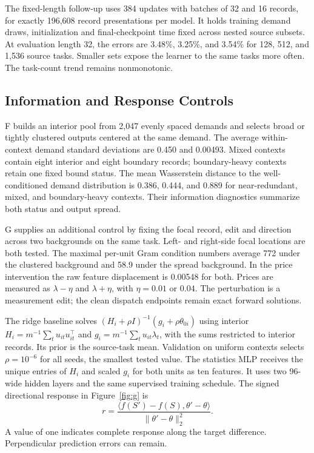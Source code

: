 \documentclass{article}
\begin{document}
The fixed-length follow-up uses 384 updates with batches of 32 and
16 records, for exactly 196,608 record presentations per model. It
holds training demand draws, initialization and final-checkpoint time
fixed across nested source subsets. At evaluation length 32, the
errors are 3.48\%, 3.25\%, and 3.54\% for 128, 512, and 1,536
source tasks. Smaller sets expose the learner to the same tasks more
often. The task-count trend remains nonmonotonic.

\subsection{Information and Response Controls}
F builds an interior pool from 2,047 evenly spaced demands and selects
broad or tightly clustered outputs centered at the same demand.
The average within-context demand standard deviations are 0.450 and
0.00493. Mixed contexts contain eight interior and eight boundary
records; boundary-heavy contexts retain one fixed bound status.
The mean Wasserstein distance to the well-conditioned demand
distribution is 0.386, 0.444, and 0.889 for near-redundant, mixed,
and boundary-heavy contexts. Their information diagnostics summarize
both status and output spread.

\begin{table}[h]
\centering

\caption{F, 16-record contexts on matched tasks. The Gram diagnostic
is the smallest interior-Gram eigenvalue across generators, normalized
by total context length. Error shows mean $\pm$ seed SD.}
\label{tab:f}
\end{table}

G supplies an additional control by fixing the focal record, edit and
direction across two backgrounds on the same task. Left- and right-side
focal locations are both tested. The maximal per-unit Gram condition
numbers average 772 under the clustered background and 58.9 under
the spread background. In the price intervention the raw feature
displacement is 0.00548 for both. Prices are measured as
$\lambda-\eta$ and $\lambda+\eta$, with $\eta=0.01$ or $0.04$.
The perturbation is a measurement edit; the clean dispatch endpoints
remain exact forward solutions.

The ridge baseline solves
$(H_i+\rho I)^{-1}(g_i+\rho\theta_{0i})$ using interior
$H_i=m^{-1}\sum_t u_{it}u_{it}^\top$ and
$g_i=m^{-1}\sum_tu_{it}\lambda_t$, with the sums restricted to
interior records. Its prior is the source-task mean. Validation on
uniform contexts selects $\rho=10^{-6}$ for all seeds, the smallest
tested value. The statistics MLP receives the unique entries of
$H_i$ and scaled $g_i$ for both units as ten features. It uses two
96-wide hidden layers and the same supervised training schedule.
The signed directional response in Figure~\ref{fig:g} is
\[
r=\frac{\langle f(S')-f(S),\theta'-\theta\rangle}
         {\|\theta'-\theta\|_2^2}.
\]
A value of one indicates complete response along the target difference.
Perpendicular prediction errors can remain.
\end{document}
